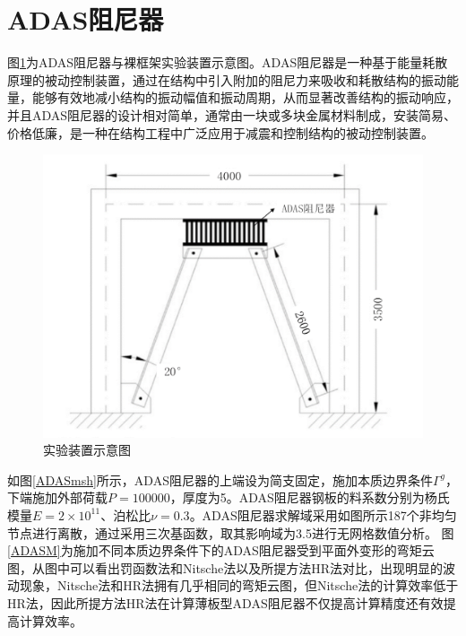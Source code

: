 \section{ADAS阻尼器}
图\ref{ADAS1}为ADAS阻尼器与裸框架实验装置示意图。ADAS阻尼器是一种基于能量耗散原理的被动控制装置，通过在结构中引入附加的阻尼力来吸收和耗散结构的振动能量，能够有效地减小结构的振动幅值和振动周期，从而显著改善结构的振动响应，
并且ADAS阻尼器的设计相对简单，通常由一块或多块金属材料制成，安装简易、价格低廉，是一种在结构工程中广泛应用于减震和控制结构的被动控制装置。
\begin{figure}[H]
    \centering
    \includegraphics[scale=0.6]{figure/DAMPER/ADAS/1.png}
    \caption{实验装置示意图\cite{basu2016}}\label{ADAS1}
\end{figure}
如图\ref{ADASmsh}所示，ADAS阻尼器的上端设为简支固定，施加本质边界条件$\Gamma^g$，下端施加外部荷载$P=100000$，厚度为5。ADAS阻尼器钢板的料系数分别为杨氏模量$E=2\times 10^{11}$、泊松比$\nu=0.3$。ADAS阻尼器求解域采用如图所示187个非均匀节点进行离散，通过采用三次基函数，取其影响域为3.5进行无网格数值分析。
图\ref{ADASM}为施加不同本质边界条件下的ADAS阻尼器受到平面外变形的弯矩云图，从图中可以看出罚函数法和Nitsche法以及所提方法HR法对比，出现明显的波动现象，Nitsche法和HR法拥有几乎相同的弯矩云图，但Nitsche法的计算效率低于HR法，因此所提方法HR法在计算薄板型ADAS阻尼器不仅提高计算精度还有效提高计算效率。
\newpage
